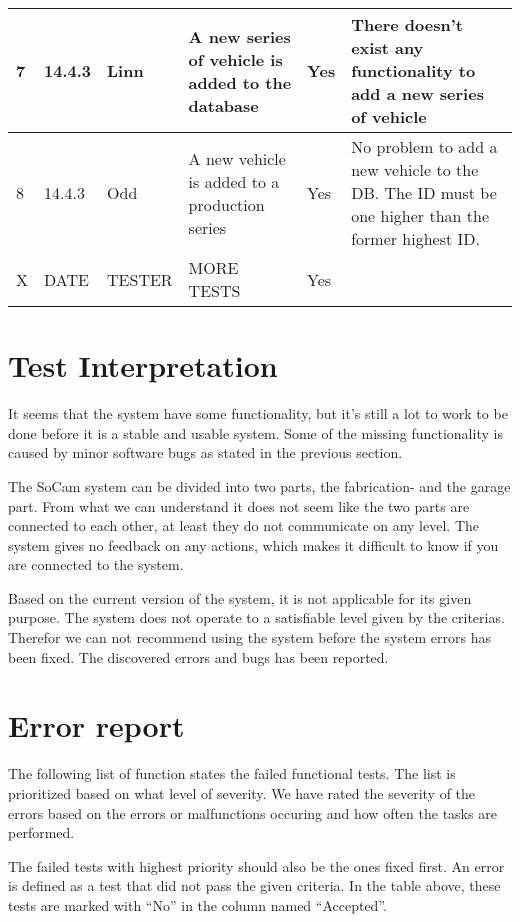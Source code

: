 \begin{center}
\begin{longtable}{| l | l | l | p{3cm}  | l | p{5cm} |}
	    7 & 14.4.3 & Linn & A new series of vehicle is added to the database & Yes & There doesn't exist any functionality to add a new series of vehicle \\ \hline
	    8 & 14.4.3 & Odd & A new vehicle is added to a production series & Yes & No problem to add a new vehicle to the DB. The ID must be one higher than the former highest ID. \\ \hline
	    X & DATE & TESTER & MORE TESTS & Yes &  \\ \hline

	    \hline
	    \end{longtable}
	\end{center}

	\section{Test Interpretation}

		It seems that the system have some functionality, but it’s still a lot to work to be done before it is a stable and usable system. Some of the missing functionality is caused by minor software bugs as stated in the previous section.

		The SoCam system can be divided into two parts, the fabrication- and the garage part. From what we can understand it does not seem like the two parts are connected to each other, at least they do not communicate on any level.  The system gives no feedback on any actions, which makes it difficult to know if you are connected to the system. 

		Based on the current version of the system, it is not applicable for its given purpose. The system does not operate to a satisfiable level given by the criterias. Therefor we can not recommend using the system before the system errors has been fixed. The discovered errors and bugs has been reported. 

	\clearpage
	\section{Error report}

		The following list of function states the failed functional tests. The list is prioritized based on what level of severity. We have rated the severity of the errors based on the errors or malfunctions occuring and how often the tasks are performed. 

		The failed tests with highest priority should also be the ones fixed first. An error is defined as a test that did not pass the given criteria. In the table above, these tests are marked with “No” in the column named “Accepted”. 

